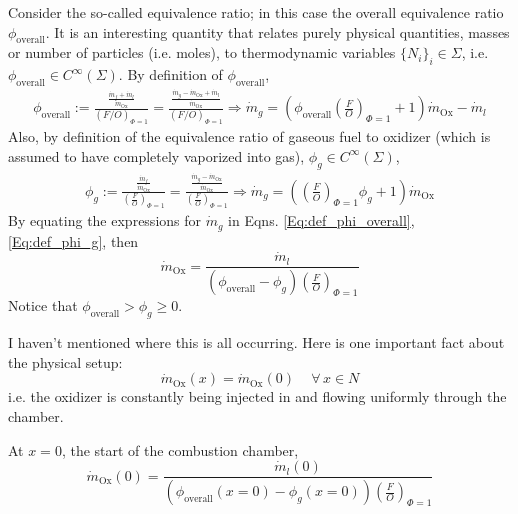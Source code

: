 \documentclass[10pt]{amsart}
\begin{document}
\begin{multicols*}{2}
Consider the so-called equivalence ratio; in this case the overall equivalence ratio $\phi_{\text{overall}}$.  It is an interesting quantity that relates purely physical quantities, masses or number of particles (i.e. moles), to thermodynamic variables $\lbrace N_i \rbrace_i \in \Sigma$, i.e. $\phi_{\text{overall}} \in C^{\infty}(\Sigma)$.  By definition of $\phi_{\text{overall}}$, 
\begin{equation}\label{Eq:def_phi_overall}
\begin{gathered}
  \phi_{\text{overall}} := \frac{ \frac{\dot{m}_f + \dot{m}_l }{ \dot{m}_{\text{Ox}} } }{ (F/O)_{\Phi =1} } = \frac{ \frac{ \dot{m}_g - \dot{m}_{\text{Ox}} + \dot{m}_l }{ \dot{m}_{\text{Ox}} } }{  (F/O)_{\Phi =1} } \Longrightarrow \dot{m}_g = \left( \phi_{\text{overall}} \left( \frac{F}{O} \right)_{\Phi =1} + 1 \right) \dot{m}_{\text{Ox}} - \dot{m}_l
\end{gathered}
\end{equation}
Also, by definition of the equivalence ratio of gaseous fuel to oxidizer (which is assumed to have completely vaporized into gas), $\phi_g \in C^{\infty}(\Sigma)$, 
\begin{equation}\label{Eq:def_phi_g}
\begin{gathered}
  \phi_g := \frac{ \frac{\dot{m}_f}{ \dot{m}_{\text{Ox}} } }{ \left( \frac{F}{O} \right)_{\Phi =1} } = \frac{ \frac{ \dot{m}_g - \dot{m}_{\text{Ox}} }{ \dot{m}_{\text{Ox}} } }{ \left( \frac{F}{O} \right)_{\Phi =1} } \Longrightarrow \dot{m}_g = \left( \left( \frac{F}{O} \right)_{\Phi =1} \phi_g + 1 \right) \dot{m}_{\text{Ox} } 
\end{gathered}
\end{equation}
By equating the expressions for $\dot{m}_g$ in Eqns. \ref{Eq:def_phi_overall}, \ref{Eq:def_phi_g}, then
\[
\dot{m}_{\text{Ox}} = \frac{ \dot{m}_l }{ \left( \phi_{\text{overall}} - \phi_g \right) \left( \frac{F}{O} \right)_{\Phi=1} }
\]
Notice that $\phi_{\text{overall}} > \phi_g \geq 0$.  

I haven't mentioned where this is all occurring.  Here is one important fact about the physical setup: 
\[
\dot{m}_{\text{Ox}}(x) = \dot{m}_{\text{Ox}}(0) \quad \, \forall \, x \in N
\]
i.e. the oxidizer is constantly being injected in and flowing uniformly through the chamber.

At $x=0$, the start of the combustion chamber, 
\begin{equation}\label{Eq:dotm_Ox0}
\dot{m}_{\text{Ox}}(0) = \frac{\dot{m}_l(0) }{ \left( \phi_{\text{overall}}(x=0) - \phi_g(x=0) \right) \left( \frac{F}{O} \right)_{\Phi=1} }
\end{equation}


\end{multicols*}
\end{document}
